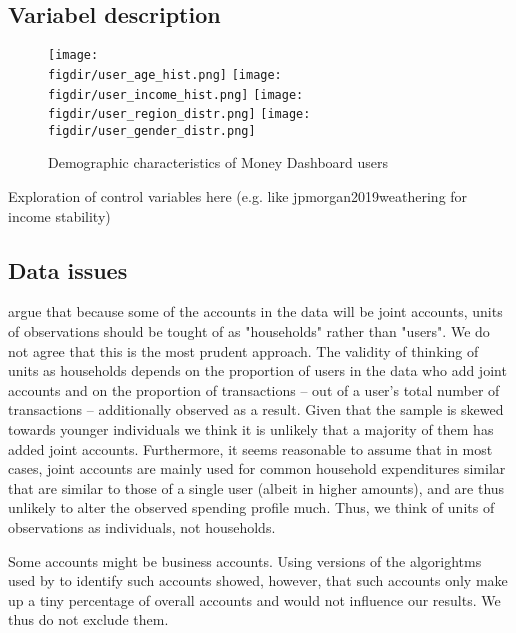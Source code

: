 \subsection{Variabel description}%
\label{sub:variabel_description}

\begin{figure}[H]
    \caption{Demographic characteristics of Money Dashboard users}
    \label{fig:demographics}
    \begin{center}
        \texttt{[image: \\figdir/user\_age\_hist.png]}
        \texttt{[image: \\figdir/user\_income\_hist.png]}
        \texttt{[image: \\figdir/user\_region\_distr.png]}
        \texttt{[image: \\figdir/user\_gender\_distr.png]}
    \end{center}
\end{figure}

Exploration of control variables here (e.g. like jpmorgan2019weathering for
income stability)





\subsection{Data issues}%
\label{sub:data_issues}

\citet{bourquin2020effects} argue that because some of the accounts in the data
will be joint accounts, units of observations should be tought of as
"households" rather than "users". We do not agree that this is the most prudent
approach. The validity of thinking of units as households depends on the
proportion of users in the data who add joint accounts and on the proportion of
transactions -- out of a user's total number of transactions -- additionally observed as a
result. Given that the sample is skewed towards younger individuals we think it
is unlikely that a majority of them has added joint accounts. Furthermore, it
seems reasonable to assume that in most cases, joint accounts are mainly used
for common household expenditures similar that are similar to those of a single
user (albeit in higher amounts), and are thus unlikely to alter the observed
spending profile much. Thus, we think of units of observations as individuals,
not households. 

Some accounts might be business accounts. Using versions of the algorightms
used by \citet{bourquin2020effects} to identify such accounts showed, however,
that such accounts only make up a tiny percentage of overall accounts and would
not influence our results. We thus do not exclude them.



